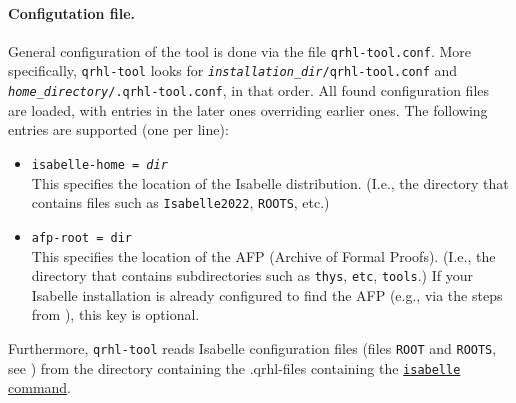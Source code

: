 \documentclass{article}
\begin{document}
\paragraph{Configutation file.}%
General configuration of the tool is done via the file \texttt{qrhl-tool.conf}.
More specifically, \texttt{qrhl-tool} looks for \texttt{\textnormal{\textit{installation\_dir}}/qrhl-tool.conf} and
\texttt{\textnormal{\textit{home\_directory}}/.qrhl-tool.conf}, in that order.
All found configuration files are loaded, with entries in the later ones overriding earlier ones.
The following entries are supported (one per line):
\begin{itemize}
\item \texttt{isabelle-home = \textnormal{\textit{dir}}} \\
  This specifies the location of the Isabelle distribution.
  (I.e., the directory that contains files such as \texttt{Isabelle2022}, \texttt{ROOTS}, etc.)
\item \texttt{afp-root = \textnormal{\texttt{dir}}} \\
  This specifies the location of the AFP (Archive of Formal Proofs).
  (I.e., the directory that contains subdirectories such as \texttt{thys}, \texttt{etc}, \texttt{tools}.)
  If your Isabelle installation is already configured to find the AFP (e.g., via the steps from \cite{using-afp}), this key is optional.
\end{itemize}
Furthermore, \texttt{qrhl-tool} reads Isabelle configuration files (files \texttt{ROOT} and \texttt{ROOTS}, see \cite{isabelle-system}) from the directory containing the .qrhl-files containing the \hyperref[command:isabelle]{\texttt{isabelle} command}.
\end{document}
